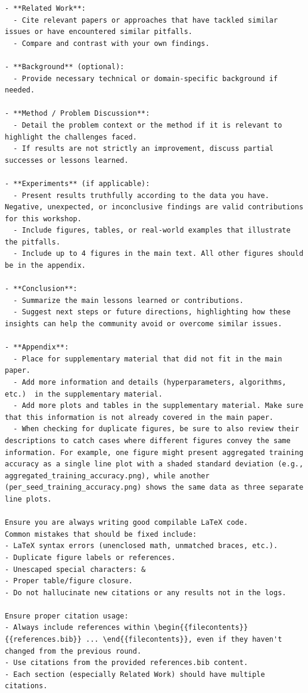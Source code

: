 \begin{appendices}
\begin{tcolorbox}[breakable, colback=orange!5!white, colframe=orange!80!black, title=Manuscript Writing Prompt (ICBINB workshop specific)]
\begin{Verbatim}[breaklines, breaksymbol={}, breaksymbolleft={}, fontsize=\small]
- **Related Work**:
  - Cite relevant papers or approaches that have tackled similar issues or have encountered similar pitfalls.
  - Compare and contrast with your own findings.

- **Background** (optional):
  - Provide necessary technical or domain-specific background if needed.

- **Method / Problem Discussion**:
  - Detail the problem context or the method if it is relevant to highlight the challenges faced.
  - If results are not strictly an improvement, discuss partial successes or lessons learned.

- **Experiments** (if applicable):
  - Present results truthfully according to the data you have. Negative, unexpected, or inconclusive findings are valid contributions for this workshop.
  - Include figures, tables, or real-world examples that illustrate the pitfalls.
  - Include up to 4 figures in the main text. All other figures should be in the appendix.

- **Conclusion**:
  - Summarize the main lessons learned or contributions.
  - Suggest next steps or future directions, highlighting how these insights can help the community avoid or overcome similar issues.

- **Appendix**:
  - Place for supplementary material that did not fit in the main paper.
  - Add more information and details (hyperparameters, algorithms, etc.)  in the supplementary material.
  - Add more plots and tables in the supplementary material. Make sure  that this information is not already covered in the main paper.
  - When checking for duplicate figures, be sure to also review their descriptions to catch cases where different figures convey the same information. For example, one figure might present aggregated training accuracy as a single line plot with a shaded standard deviation (e.g., aggregated_training_accuracy.png), while another (per_seed_training_accuracy.png) shows the same data as three separate line plots.

Ensure you are always writing good compilable LaTeX code.
Common mistakes that should be fixed include:
- LaTeX syntax errors (unenclosed math, unmatched braces, etc.).
- Duplicate figure labels or references.
- Unescaped special characters: &
- Proper table/figure closure.
- Do not hallucinate new citations or any results not in the logs.

Ensure proper citation usage:
- Always include references within \begin{{filecontents}}{{references.bib}} ... \end{{filecontents}}, even if they haven't changed from the previous round.
- Use citations from the provided references.bib content.
- Each section (especially Related Work) should have multiple citations.


\end{Verbatim}
\end{tcolorbox}
\end{appendices}
